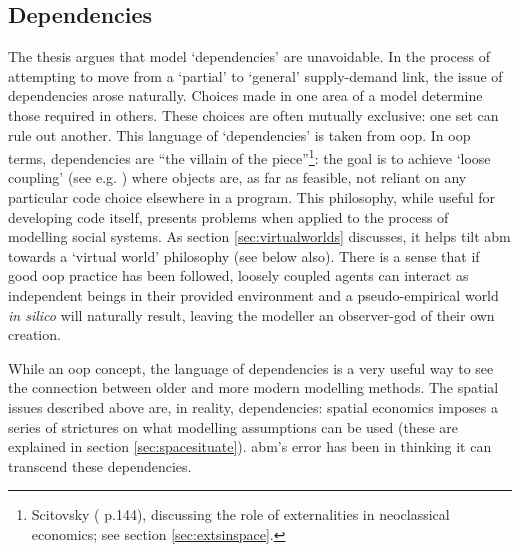 \subsection{Dependencies \label{sec:deps}}

The thesis argues that model `dependencies' are unavoidable. In the process of attempting to move from a `partial' to `general' supply-demand link, the issue of dependencies arose naturally. Choices made in one area of a model determine those required in others. These choices are often mutually exclusive: one set can rule out another. This language of `dependencies' is taken from \gls{oop}. In \gls{oop} terms, dependencies are ``the villain of the piece''\footnote{Scitovsky (\citeyear{scitovsky_two_1954} p.144), discussing the role of externalities in neoclassical economics; see section \ref{sec:extsinspace}.}: the goal is to achieve `loose coupling' (see e.g. \citealt{jana_java_2005}) where objects are, as far as feasible, not reliant on any particular code choice elsewhere in a program. This philosophy, while useful for developing code itself, presents problems when applied to the process of modelling social systems.  As section \ref{sec:virtualworlds} discusses, it helps tilt \gls{abm} towards a `virtual world' philosophy (see below also). There is a sense that if good \gls{oop} practice has been followed, loosely coupled agents can interact as independent beings in their provided environment and a pseudo-empirical world \emph{in silico} will naturally result, leaving the modeller an observer-god of their own creation.

While an \gls{oop} concept, the language of dependencies is a very useful way to see the connection between older and more modern modelling methods. The spatial issues described above are, in reality, dependencies: spatial economics imposes a series of strictures on what modelling assumptions can be used (these are explained in section \ref{sec:spacesituate}). \gls{abm}'s error has been in thinking it can transcend these dependencies.

